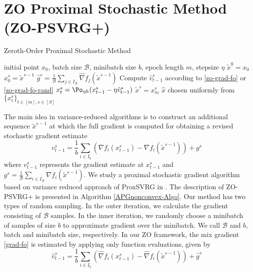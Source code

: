 \section{ZO Proximal Stochastic Method (ZO-PSVRG+)}
\begin{algorithm}
\caption{Zeroth-Order Proximal Stochastic Method}
\begin{algorithmic}[1]
\State\Input initial point $x_0$, batch size $\mathcal{B}$, minibatch size $b$, epoch length $m$, stepsize $\eta$
\State\Initialize $\tilde{x}^0 = x_0$
\State $x_0^s = \tilde{x}^{s-1}$
\State $\hat{g}^s = \frac{1}{\mathcal{B}} \sum_{j\in I_{\mathcal{B}}} \hat{\nabla} f_j (\tilde{x}^{s-1})$
\State Compute ${\hat{v}}_{t-1}^s$ according to \eqref{zo-grad-fo} or \eqref{zo-grad-fo-rand}
\State $x_{t}^s= \Po_{\eta h}(x_{t-1}^s - \eta \hat{v}_{t-1}^s)$
\EndFor
\State $\tilde{x}^{s} = x_m^s$
 \EndFor
 \State\Output $\hat{x}$ chosen uniformly from $\{x_{t}^s\}_{t\in [m], s\in [S]}$
\end{algorithmic}
\label{APGnonconvex-Algo}
\end{algorithm}
The main idea in variance-reduced algorithms is to construct an additional sequence $\tilde{x}^{s-1}$ at which the full gradient is computed for obtaining  a revised stochastic gradient estimate
\begin{equation}\label{grad-fo}
{{v}}_{t-1}^s = \frac{1}{b} \sum_{i\in I_b}\left({\nabla} f_{i}(x_{t-1}^s)-{\nabla} f_{i}(\tilde{x}^{s-1})\right)+{g}^s
\end{equation}
where ${{v}}_{t-1}^s$ represents the gradient estimate at $x_{t-1}^s$ and  ${g}^s= \frac{1}{\mathcal{B}}\sum_{i\in I_{\mathcal{B}}}{\nabla} f_{i}(\tilde{x}^{s-1})$. We study a proximal stochastic gradient algorithm based on variance reduced approach of ProxSVRG in  \cite{xiao2014proximal,reddi2016proximal,li2018simple}.
The description of ZO-PSVRG+ is presented in Algorithm \ref{APGnonconvex-Algo}. Our method has two types of random sampling. In the outer iteration, we calculate the gradient consisting of $\mathcal{B}$ samples. In the inner iteration, we randomly  choose a minibatch of samples of size $b$ to approximate  gradient over the minibatch. We call $\mathcal{B}$ and $b$, batch and  minibatch size, respectively. 
In our ZO framework, the mix gradient \eqref{grad-fo} is estimated by applying only function evaluations, given by
\begin{equation}\label{zo-grad-fo}
{\hat{v}}_{t-1}^s = \frac{1}{b} \sum_{i\in I_b}\left(\hat{\nabla} f_{i}(x_{t-1}^s)-\hat{\nabla} f_{i}(\tilde{x}^{s-1})\right)+\hat{g}^s
\end{equation}
